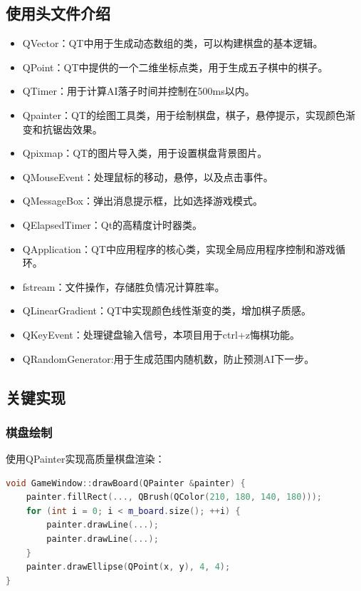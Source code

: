 \documentclass[UTF8]{ctexart}
\begin{document}
\subsection{使用头文件介绍}
\begin{itemize}
\item QVector：QT中用于生成动态数组的类，可以构建棋盘的基本逻辑。
\item QPoint：QT中提供的一个二维坐标点类，用于生成五子棋中的棋子。
\item QTimer：用于计算AI落子时间并控制在500ms以内。
\item Qpainter：QT的绘图工具类，用于绘制棋盘，棋子，悬停提示，实现颜色渐变和抗锯齿效果。
\item Qpixmap：QT的图片导入类，用于设置棋盘背景图片。
\item QMouseEvent：处理鼠标的移动，悬停，以及点击事件。
\item QMessageBox：弹出消息提示框，比如选择游戏模式。
\item QElapsedTimer：Qt的高精度计时器类。
\item QApplication：QT中应用程序的核心类，实现全局应用程序控制和游戏循环。
\item fstream：文件操作，存储胜负情况计算胜率。
\item QLinearGradient：QT中实现颜色线性渐变的类，增加棋子质感。
\item QKeyEvent：处理键盘输入信号，本项目用于ctrl+z悔棋功能。
\item QRandomGenerator:用于生成范围内随机数，防止预测AI下一步。
\end{itemize}

\subsection{关键实现}
\subsubsection{棋盘绘制}
使用QPainter实现高质量棋盘渲染：
\begin{lstlisting}[language=C++]
void GameWindow::drawBoard(QPainter &painter) {
    painter.fillRect(..., QBrush(QColor(210, 180, 140, 180)));
    for (int i = 0; i < m_board.size(); ++i) {
        painter.drawLine(...);
        painter.drawLine(...);
    }
    painter.drawEllipse(QPoint(x, y), 4, 4);
}
\end{lstlisting}
\end{document}
